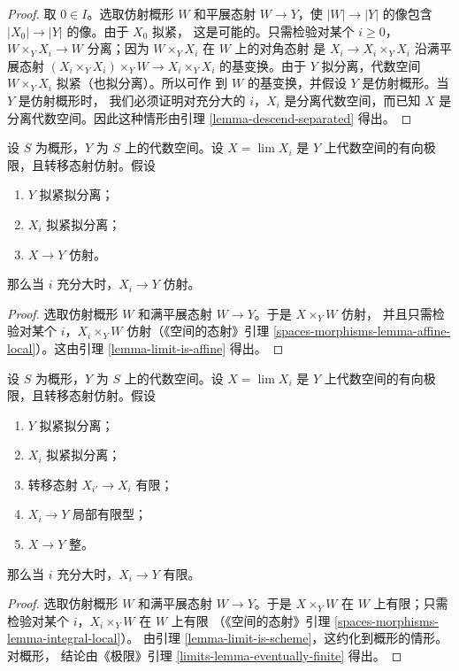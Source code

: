 \begin{proof}
取 $0\in I$。选取仿射概形 $W$ 和平展态射 $W\to Y$，使
$|W|\to|Y|$ 的像包含 $|X_0|\to|Y|$ 的像。由于 $X_0$ 拟紧，
这是可能的。只需检验对某个 $i\geq0$，
$W\times_YX_i\to W$ 分离；因为 $W\times_YX_i$ 在 $W$ 上的对角态射
是 $X_i\to X_i\times_YX_i$ 沿满平展态射
$(X_i\times_YX_i)\times_YW\to X_i\times_YX_i$ 的基变换。由于
$Y$ 拟分离，代数空间 $W\times_YX_i$ 拟紧（也拟分离）。所以可作
到 $W$ 的基变换，并假设 $Y$ 是仿射概形。当 $Y$ 是仿射概形时，
我们必须证明对充分大的 $i$，$X_i$ 是分离代数空间，而已知 $X$
是分离代数空间。因此这种情形由引理 \ref{lemma-descend-separated}
得出。
\end{proof}

\begin{lemma}
\label{lemma-eventually-affine}
设 $S$ 为概形，$Y$ 为 $S$ 上的代数空间。设 $X=\lim X_i$ 是 $Y$
上代数空间的有向极限，且转移态射仿射。假设
\begin{enumerate}
\item $Y$ 拟紧拟分离；
\item $X_i$ 拟紧拟分离；
\item $X\to Y$ 仿射。
\end{enumerate}
那么当 $i$ 充分大时，$X_i\to Y$ 仿射。
\end{lemma}

\begin{proof}
选取仿射概形 $W$ 和满平展态射 $W\to Y$。于是 $X\times_YW$ 仿射，
并且只需检验对某个 $i$，$X_i\times_YW$ 仿射（《空间的态射》引理
\ref{spaces-morphisms-lemma-affine-local}）。这由引理
\ref{lemma-limit-is-affine} 得出。
\end{proof}

\begin{lemma}
\label{lemma-eventually-finite}
设 $S$ 为概形，$Y$ 为 $S$ 上的代数空间。设 $X=\lim X_i$ 是 $Y$
上代数空间的有向极限，且转移态射仿射。假设
\begin{enumerate}
\item $Y$ 拟紧拟分离；
\item $X_i$ 拟紧拟分离；
\item 转移态射 $X_{i'}\to X_i$ 有限；
\item $X_i\to Y$ 局部有限型；
\item $X\to Y$ 整。
\end{enumerate}
那么当 $i$ 充分大时，$X_i\to Y$ 有限。
\end{lemma}

\begin{proof}
选取仿射概形 $W$ 和满平展态射 $W\to Y$。于是 $X\times_YW$ 在 $W$
上有限；只需检验对某个 $i$，$X_i\times_YW$ 在 $W$ 上有限
（《空间的态射》引理 \ref{spaces-morphisms-lemma-integral-local}）。
由引理 \ref{lemma-limit-is-scheme}，这约化到概形的情形。对概形，
结论由《极限》引理 \ref{limits-lemma-eventually-finite} 得出。
\end{proof}

